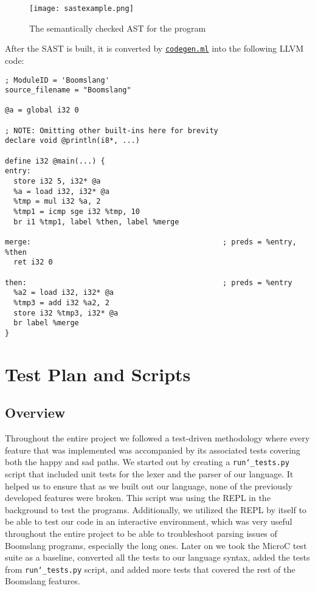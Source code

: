 \documentclass{article}
\begin{document}
\begin{figure}[h]
\caption{The semantically checked AST for the program}
\centering
\texttt{[image: sastexample.png]}
\label{fig:sast}
\end{figure}

After the SAST is built, it is converted by \hyperref[sec:codegenml]{\texttt{codegen.ml}} into the following LLVM code:

\begin{verbatim}
; ModuleID = 'Boomslang'
source_filename = "Boomslang"

@a = global i32 0

; NOTE: Omitting other built-ins here for brevity
declare void @println(i8*, ...)

define i32 @main(...) {
entry:
  store i32 5, i32* @a
  %a = load i32, i32* @a
  %tmp = mul i32 %a, 2
  %tmp1 = icmp sge i32 %tmp, 10
  br i1 %tmp1, label %then, label %merge

merge:                                            ; preds = %entry, %then
  ret i32 0

then:                                             ; preds = %entry
  %a2 = load i32, i32* @a
  %tmp3 = add i32 %a2, 2
  store i32 %tmp3, i32* @a
  br label %merge
}
\end{verbatim}

\section{Test Plan and Scripts}

\subsection{Overview}
Throughout the entire project we followed a test-driven methodology where every feature that was implemented was accompanied by its associated tests covering both the happy and sad paths. We started out by creating a \texttt{run\char`_tests.py} script that included unit tests for the lexer and the parser of our language. It helped us to ensure that as we built out our language, none of the previously developed features were broken. This script was using the REPL in the background to test the programs. Additionally, we utilized the REPL by itself to be able to test our code in an interactive environment, which was very useful throughout the entire project to be able to troubleshoot parsing issues of Boomslang programs, especially the long ones. Later on we took the MicroC test suite as a baseline, converted all the tests to our language syntax, added the tests from \texttt{run\char`_tests.py} script, and added more tests that covered the rest of the Boomslang features.
\end{document}
